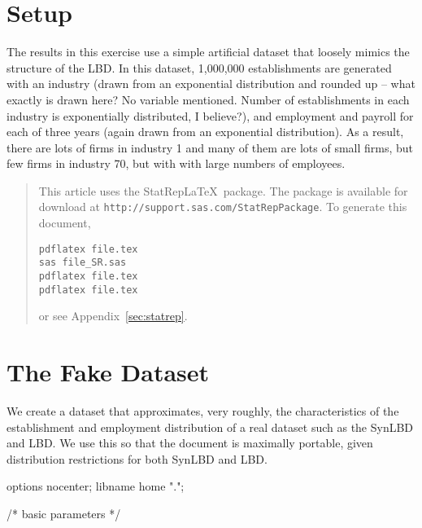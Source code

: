 \documentclass{article}
\newcommand*{\Statrep}{\mbox{\textsf{StatRep}}\xspace}
\begin{document}
\section{Setup}

The results in this exercise use a simple artificial dataset that loosely mimics the structure of the LBD.  In this dataset, 1,000,000 establishments are generated with an industry (drawn from an exponential distribution and rounded up – what exactly is drawn here? No variable mentioned. Number of establishments in each industry is exponentially distributed, I believe?), and employment and payroll for each of three years (again drawn from an exponential distribution).  As a result, there are lots of firms in industry 1 and many of them are lots of small firms, but few firms in industry 70, but with with large numbers of employees.



\begin{quotation}
This article uses the \Statrep \LaTeX\ package.
The package is available
for download at \texttt{http://support.sas.com/StatRepPackage}. To generate this document, 
\begin{verbatim}
pdflatex file.tex
sas file_SR.sas
pdflatex file.tex
pdflatex file.tex
\end{verbatim}
or see Appendix~\ref{sec:statrep}.
\end{quotation}


\section{The Fake Dataset}
We create a dataset that approximates, very roughly, the characteristics of the establishment and employment distribution of a real dataset such as the SynLBD and LBD. We use this so that the document is maximally portable, given distribution restrictions for both SynLBD and LBD.

\begin{Datastep}[program]
options nocenter;
libname home ".";

/* basic parameters */


\end{Datastep}
\end{document}
